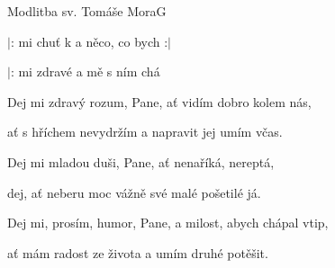 \begin{song}{Modlitba sv. Tomáše Mora}{G}{}

\begin{SBVerse}

$|$:  mi chuť k   a  něco, co bych :$|$

$|$:  mi zdravé   a  mě s ním chá

\end{SBVerse}

\begin{SBVerse}

Dej mi zdravý rozum, Pane, ať vidím dobro kolem nás,

ať s hříchem nevydržím a napravit jej umím včas.

\end{SBVerse}

\begin{SBVerse}

Dej mi mladou duši, Pane, ať nenaříká, nereptá,

dej, ať neberu moc vážně své malé pošetilé já.

\end{SBVerse}

\begin{SBVerse}

Dej mi, prosím, humor, Pane, a milost, abych chápal vtip,

ať mám radost ze života a umím druhé potěšit.

\end{SBVerse}

\end{song}
\pagebreak
